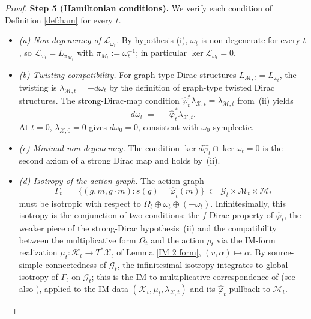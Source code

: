 \documentclass[reqno]{amsart}
\theoremstyle{plain}
\theoremstyle{definition}
\newcommand{\M}{\mathcal{M}}
\renewcommand{\L}{\mathcal{L}}
\begin{document}
\begin{proof}
\medskip
\noindent\textbf{Step 5 (Hamiltonian conditions).}
We verify each condition of Definition \ref{def:ham} for every $t$.

\begin{itemize}
\item \emph{(a) Non-degeneracy of $\L_{\omega_t}$.} By hypothesis (i), $\omega_t$ is non-degenerate for every $t$, so $\L_{\omega_t} = L_{\pi_{\M_t}}$ with
$\pi_{M_t} := \omega_t^{-1}$; in particular $\ker \L_{\omega_t} = 0$.
 
\item \emph{(b) Twisting compatibility.} For graph-type Dirac structures
$L_{\mathcal{M},t} = L_{\omega_t}$, the twisting is
$\lambda_{\mathcal{M},t} = -d\omega_t$ by the definition of graph-type
twisted Dirac structures. The strong-Dirac-map condition
$\hat\varphi_t^{*}\lambda_{\mathcal{X},t} = \lambda_{\mathcal{M},t}$ from~(ii)
yields
\[
   d\omega_t \;=\; -\hat\varphi_t^{*}\lambda_{\mathcal{X},t}.
\]
At $t = 0$, $\lambda_{\mathcal{X},0} = 0$ gives $d\omega_0 = 0$, consistent
with $\omega_0$ symplectic.
 
\item \emph{(c) Minimal non-degeneracy.} The condition
$\ker d\hat\varphi_t \cap \ker \omega_t = 0$ is the second axiom of a strong
Dirac map and holds by~(ii).
 
\item \emph{(d) Isotropy of the action graph.} The action graph
\[
   \Gamma_t \;=\; \{(g, m, g \cdot m) : s(g) = \hat\varphi_t(m)\}
   \;\subset\; \mathcal{G}_t \times \M_t \times \M_t
\]
must be isotropic with respect to $\Omega_t \oplus \omega_t \oplus (-\omega_t)$.
Infinitesimally, this isotropy is the conjunction of two conditions: the
$f$-Dirac property of $\hat\varphi_t$, the weaker piece of the strong-Dirac hypothesis~(ii) and the compatibility between the multiplicative form $\Omega_t$ and the action $\rho_t$ via the IM-form realization
$\mu_t \colon \mathcal{K}_t \to T^{*}\mathcal{X}_t$ of Lemma \ref{IM 2 form},
$(v,\alpha) \mapsto \alpha$. By source-simple-connectedness of $\mathcal{G}_t$, the infinitesimal isotropy integrates to global isotropy of $\Gamma_t$ on
$\mathcal{G}_t$; this is the IM-to-multiplicative correspondence of
\cite{bursztyn2004integration} (see also \cite{bursztyn2012multiplicative}), applied to the IM-data
$(\mathcal{K}_t, \mu_t, \lambda_{\mathcal{X},t})$ and its
$\hat\varphi_t$-pullback to $\M_t$.
\end{itemize}



\end{proof}
\end{document}

